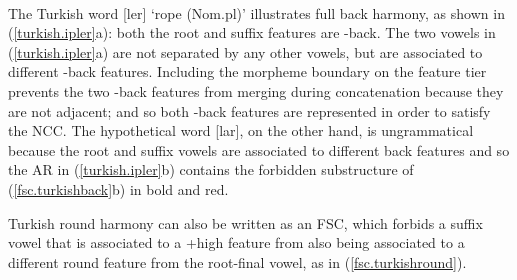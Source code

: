 \documentclass[,doc,floatsintext]{apa6}
\theoremstyle{definition}
\theoremstyle{definition}
\theoremstyle{definition}
\theoremstyle{remark}
\begin{document}
\begin{exe}
\label{turkish.ipler} \\
\end{exe}

\noindent The Turkish word {[}ler{]} `rope (Nom.pl)'
illustrates full back harmony, as shown in (\ref{turkish.ipler}a): both
the root and suffix features are -back. The two vowels in
(\ref{turkish.ipler}a) are not separated by any other vowels, but are
associated to different -back features. Including the morpheme boundary
on the feature tier prevents the two -back features from merging during
concatenation because they are not adjacent; and so both -back features
are represented in order to satisfy the NCC. The hypothetical word
{[}lar{]}, on the other hand, is ungrammatical
because the root and suffix vowels are associated to different back
features and so the AR in (\ref{turkish.ipler}b) contains the forbidden
substructure of (\ref{fsc.turkishback}b) in bold and red.

Turkish round harmony can also be written as an FSC, which forbids a
suffix vowel that is associated to a +high feature from also being
associated to a different round feature from the root-final vowel, as in
(\ref{fsc.turkishround}).
\end{document}
